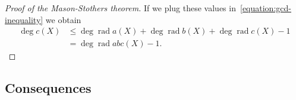 \documentclass[11pt, a4paper, openany, oneside, article]{memoir}
\theoremstyle{definition}
\DeclareMathOperator\rad{rad}
\begin{document}
\begin{proof}[Proof of the Mason-Stothers theorem]
  If we plug these values in~\eqref{equation:gcd-inequality} we obtain
  \begin{equation}
    \begin{aligned}
      \deg c(X)&\leq\deg\rad a(X)+\deg\rad b(X)+\deg\rad c(X)-1\\
      &=\deg\rad abc(X)-1.
    \end{aligned}
  \end{equation}

\end{proof}

\subsection{Consequences}




\end{document}
